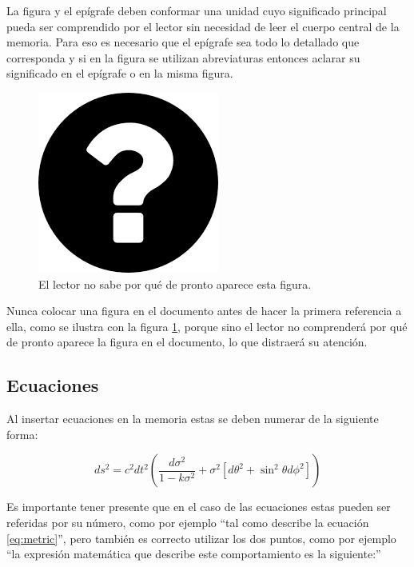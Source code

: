 

La figura y el epígrafe deben conformar una unidad cuyo significado principal pueda ser comprendido por el lector sin necesidad de leer el cuerpo central de la memoria. Para eso es necesario que el epígrafe sea todo lo detallado que corresponda y si en la figura se utilizan abreviaturas entonces aclarar su significado en el epígrafe o en la misma figura.

\begin{figure}[h]
	\centering
	\includegraphics[scale=.4]{./Figures/questionMark.png}
	\caption{El lector no sabe por qué de pronto aparece esta figura.}
	\label{fig:questionMark}
\end{figure}

Nunca colocar una figura en el documento antes de hacer la primera referencia a ella, como se ilustra con la figura \ref{fig:questionMark}, porque sino el lector no comprenderá por qué de pronto aparece la figura en el documento, lo que distraerá su atención.

\subsection{Ecuaciones}
\label{sec:Ecuaciones}

Al insertar ecuaciones en la memoria estas se deben numerar de la siguiente forma:

\begin{equation}
	\label{eq:metric}
	ds^2 = c^2 dt^2 \left( \frac{d\sigma^2}{1-k\sigma^2} + \sigma^2\left[ d\theta^2 + \sin^2\theta d\phi^2 \right] \right)
\end{equation}
                                                        
Es importante tener presente que en el caso de las ecuaciones estas pueden ser referidas por su número, como por ejemplo ``tal como describe la ecuación \ref{eq:metric}'', pero también es correcto utilizar los dos puntos, como por ejemplo ``la expresión matemática que describe este comportamiento es la siguiente:''

